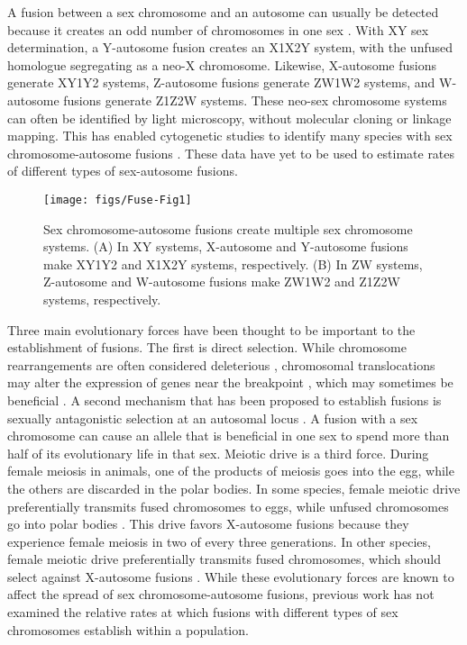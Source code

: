 A fusion between a sex chromosome and an autosome can usually be detected because it creates an odd number of chromosomes in one sex \citep[Figure \ref{fig:fuse-diag};][]{White1973, Ohno1967}. With XY sex determination, a Y-autosome fusion creates an X1X2Y system, with the unfused homologue segregating as a neo-X chromosome. Likewise, X-autosome fusions generate XY1Y2 systems, Z-autosome fusions generate ZW1W2 systems, and W-autosome fusions generate Z1Z2W systems. These neo-sex chromosome systems can often be identified by light microscopy, without molecular cloning or linkage mapping. This has enabled cytogenetic studies to identify many species with sex chromosome-autosome fusions \citep{White1973, Ezaz2009, Kitano2012, Yoshida2012, Maddison2013}. These data have yet to be used to estimate rates of different types of sex-autosome fusions.

\begin{figure}
\centering
\texttt{[image: figs/Fuse-Fig1]}
\caption[Schematic of sex chromosome fusions]{Sex chromosome-autosome fusions create multiple sex chromosome systems. (A) In XY systems, X-autosome and Y-autosome fusions make XY1Y2 and X1X2Y systems, respectively. (B) In ZW systems, Z-autosome and W-autosome fusions make ZW1W2 and Z1Z2W systems, respectively.}
\label{fig:fuse-diag}
\end{figure}

Three main evolutionary forces have been thought to be important to the establishment of fusions. The first is direct selection. While chromosome rearrangements are often considered deleterious \citep{King1993, Gardner2012}, chromosomal translocations may alter the expression of genes near the breakpoint \citep{Ohno1967, Dobigny2004}, which may sometimes be beneficial \citep{PerezOrtin2002, Chang2013}. A second mechanism that has been proposed to establish fusions is sexually antagonistic selection at an autosomal locus \citep{Charlesworth1982}. A fusion with a sex chromosome can cause an allele that is beneficial in one sex to spend more than half of its evolutionary life in that sex. Meiotic drive is a third force. During female meiosis in animals, one of the products of meiosis goes into the egg, while the others are discarded in the polar bodies. In some species, female meiotic drive preferentially transmits fused chromosomes to eggs, while unfused chromosomes go into polar bodies \citep{Pardo2001a, Pardo2001b}. This drive favors X-autosome fusions because they experience female meiosis in two of every three generations. In other species, female meiotic drive preferentially transmits fused chromosomes, which should select against X-autosome fusions \citep{Yoshida2012}. While these evolutionary forces are known to affect the spread of sex chromosome-autosome fusions, previous work has not examined the relative rates at which fusions with different types of sex chromosomes establish within a population.
 
